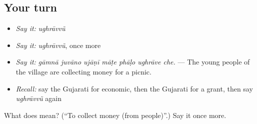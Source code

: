 \subsection*{Your turn}
\begin{itemize}
\raggedright
  \item \emph{Say it:} \emph{ughrāvvũ}
  \item \emph{Say it:} \emph{ughrāvvũ}, once more
  \item \emph{Say it:} \emph{gāmnā juvāno ujāṇī māṭe phāḷo ughrāve che.} — The young people of the village are collecting money for a picnic.
  \item \emph{Recall:} say the Gujarati for economic, then the Gujarati for a grant, then say \emph{ughrāvvũ} again
\end{itemize}

\begin{tcolorbox}[breakable,colback=teal!4,colframe=teal!35!black,title={Before you move on}]
What does  mean? (\textquotedblleft{}To collect money (from people)\textquotedblright{}.) Say it once more.
\end{tcolorbox}
